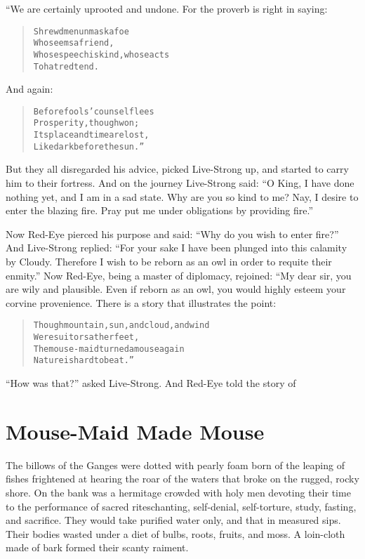 \documentclass[article, twoside, 14pt]{memoir}
\renewenvironment{verbatim}{%
\begin{quote}%
\vskip -10pt%
\begin{alltt}\normalfont\large}{\end{alltt}%
\end{quote}%
\vskip -10pt
} %
\begin{document}
“We are certainly uprooted and undone. For the proverb is right in
saying:

\begin{verbatim}
Shrewd men unmask a foe
    Who seems a friend,
Whose speech is kind, whose acts
    To hatred tend.
\end{verbatim}
And again:

\begin{verbatim}
Before fools' counsel flees
    Prosperity, though won;
Its place and time are lost,
    Like dark before the sun.”
\end{verbatim}
But they all disregarded his advice, picked Live-Strong up, and
started to carry him to their fortress. And on the journey
Live-Strong said:
``O King, I have done nothing yet, and I am in a sad state. Why are you so kind to me? Nay, I desire to enter the blazing fire. Pray put me under obligations by providing fire.''

Now Red-Eye pierced his purpose and said:
``Why do you wish to enter fire?'' And Live-Strong replied:
``For your sake I have been plunged into this calamity by Cloudy. Therefore I wish to be reborn as an owl in order to requite their enmity.''
Now Red-Eye, being a master of diplomacy, rejoined: “My dear sir,
you are wily and plausible. Even if reborn as an owl, you would
highly esteem your corvine provenience. There is a story that
illustrates the point:

\begin{verbatim}
Though mountain, sun, and cloud, and wind
    Were suitors at her feet,
The mouse-maid turned a mouse again{\textemdash}
    Nature is hard to beat.”
\end{verbatim}
``How was that?'' asked Live-Strong. And Red-Eye told the story of

\chapter{Mouse-Maid Made Mouse}

\label{s60}

The billows of the Ganges were dotted with pearly foam born
of the leaping of fishes frightened at hearing the roar of the
waters that broke on the rugged, rocky shore. On the bank was a
hermitage crowded with holy men devoting their time to the
performance of sacred rites{\textemdash}chanting, self-denial, self-torture,
study, fasting, and sacrifice. They would take purified water only,
and that in measured sips. Their bodies wasted under a diet of
bulbs, roots, fruits, and moss. A loin-cloth made of bark formed
their scanty raiment.
\end{document}
